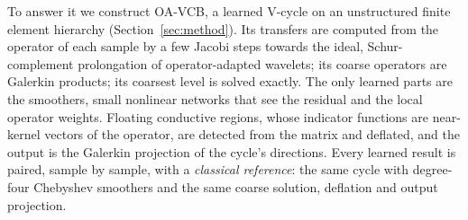 To answer it we construct OA-VCB, a learned V-cycle on an unstructured finite element hierarchy
(Section~\ref{sec:method}). Its transfers are computed from the operator of each sample by a few Jacobi steps towards the
ideal, Schur-complement prolongation of operator-adapted wavelets; its coarse operators are Galerkin products; its coarsest
level is solved exactly. The only learned parts are the smoothers, small nonlinear networks that see the residual and the
local operator weights. Floating conductive regions, whose indicator functions are near-kernel vectors of the operator, are
detected from the matrix and deflated, and the output is the Galerkin projection of the cycle's directions. Every learned
result is paired, sample by sample, with a \emph{classical reference}: the same cycle with degree-four Chebyshev smoothers
and the same coarse solution, deflation and output projection.

